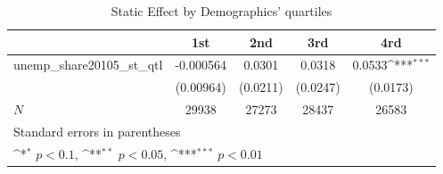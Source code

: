 \begin{table}[htbp]\centering
\def\sym#1{\ifmmode^{#1}\else\(^{#1}\)\fi}
\caption{Static Effect by Demographics' quartiles}
\begin{tabular}{l*{4}{c}}
\hline\hline
            &\multicolumn{1}{c}{1st}&\multicolumn{1}{c}{2nd}&\multicolumn{1}{c}{3rd}&\multicolumn{1}{c}{4rd}\\
\hline
unemp\_share20105\_st\_qtl&   -0.000564         &      0.0301         &      0.0318         &      0.0533\sym{***}\\
            &   (0.00964)         &    (0.0211)         &    (0.0247)         &    (0.0173)         \\
\hline
\(N\)       &       29938         &       27273         &       28437         &       26583         \\
\hline\hline
\multicolumn{5}{l}{\footnotesize Standard errors in parentheses}\\
\multicolumn{5}{l}{\footnotesize \sym{*} \(p<0.1\), \sym{**} \(p<0.05\), \sym{***} \(p<0.01\)}\\
\end{tabular}
\end{table}
